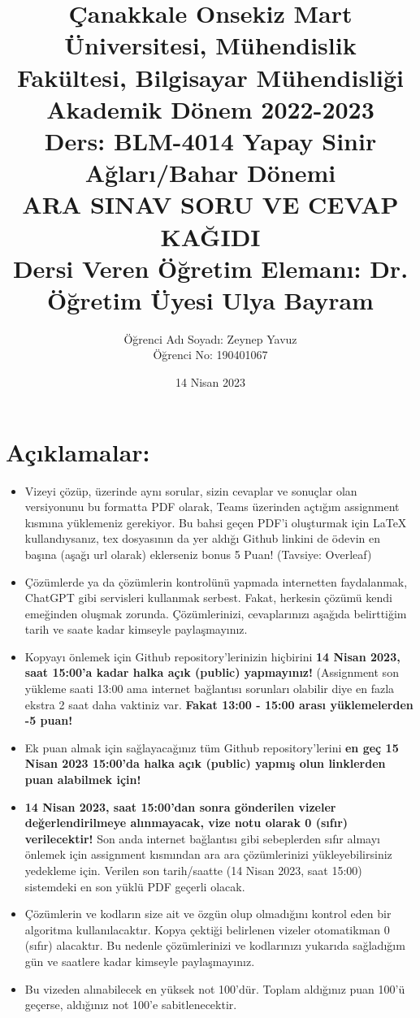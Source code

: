 \documentclass[11pt]{article}
\title{Çanakkale Onsekiz Mart Üniversitesi, Mühendislik Fakültesi, Bilgisayar Mühendisliği Akademik Dönem 2022-2023\\
Ders: BLM-4014 Yapay Sinir Ağları/Bahar Dönemi\\ 
ARA SINAV SORU VE CEVAP KAĞIDI\\
Dersi Veren Öğretim Elemanı: Dr. Öğretim Üyesi Ulya Bayram}
\author{%
\begin{minipage}{\textwidth}
\raggedright
Öğrenci Adı Soyadı: Zeynep Yavuz\\ %
Öğrenci No: 190401067
\end{minipage}%
}
\date{14 Nisan 2023}
\begin{document}
\maketitle

\vspace{-.5in}
\section*{Açıklamalar:}
\begin{itemize}
    \item Vizeyi çözüp, üzerinde aynı sorular, sizin cevaplar ve sonuçlar olan versiyonunu bu formatta PDF olarak, Teams üzerinden açtığım assignment kısmına yüklemeniz gerekiyor. Bu bahsi geçen PDF'i oluşturmak için LaTeX kullandıysanız, tex dosyasının da yer aldığı Github linkini de ödevin en başına (aşağı url olarak) eklerseniz bonus 5 Puan! (Tavsiye: Overleaf)
    \item Çözümlerde ya da çözümlerin kontrolünü yapmada internetten faydalanmak, ChatGPT gibi servisleri kullanmak serbest. Fakat, herkesin çözümü kendi emeğinden oluşmak zorunda. Çözümlerinizi, cevaplarınızı aşağıda belirttiğim tarih ve saate kadar kimseyle paylaşmayınız. 
    \item Kopyayı önlemek için Github repository'lerinizin hiçbirini \textbf{14 Nisan 2023, saat 15:00'a kadar halka açık (public) yapmayınız!} (Assignment son yükleme saati 13:00 ama internet bağlantısı sorunları olabilir diye en fazla ekstra 2 saat daha vaktiniz var. \textbf{Fakat 13:00 - 15:00 arası yüklemelerden -5 puan!}
    \item Ek puan almak için sağlayacağınız tüm Github repository'lerini \textbf{en geç 15 Nisan 2023 15:00'da halka açık (public) yapmış olun linklerden puan alabilmek için!}
    \item \textbf{14 Nisan 2023, saat 15:00'dan sonra gönderilen vizeler değerlendirilmeye alınmayacak, vize notu olarak 0 (sıfır) verilecektir!} Son anda internet bağlantısı gibi sebeplerden sıfır almayı önlemek için assignment kısmından ara ara çözümlerinizi yükleyebilirsiniz yedekleme için. Verilen son tarih/saatte (14 Nisan 2023, saat 15:00) sistemdeki en son yüklü PDF geçerli olacak.
    \item Çözümlerin ve kodların size ait ve özgün olup olmadığını kontrol eden bir algoritma kullanılacaktır. Kopya çektiği belirlenen vizeler otomatikman 0 (sıfır) alacaktır. Bu nedenle çözümlerinizi ve kodlarınızı yukarıda sağladığım gün ve saatlere kadar kimseyle paylaşmayınız.
    \item Bu vizeden alınabilecek en yüksek not 100'dür. Toplam aldığınız puan 100'ü geçerse, aldığınız not 100'e sabitlenecektir.

\end{itemize}
\end{document}
